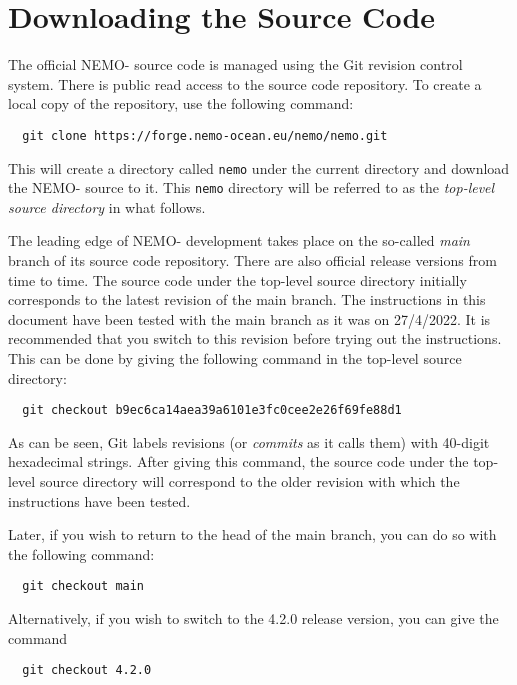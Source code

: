 \section{Downloading the Source Code}
\label{sec:download}

The official NEMO-\SIcu{} source code is managed using the Git revision control system.
There is public read access to the source code repository.
To create a local copy of the repository, use the following command:

\begin{verbatim}
  git clone https://forge.nemo-ocean.eu/nemo/nemo.git
\end{verbatim}

\noindent{}This will create a directory called \verb|nemo| under the current directory and download the NEMO-\SIcu{} source to it.
This \verb|nemo| directory will be referred to as the \textit{top-level source directory} in what follows.

The leading edge of NEMO-\SIcu{} development takes place on the so-called \textit{main} branch of its source code repository.
There are also official release versions from time to time.
The source code under the top-level source directory initially corresponds to the latest revision of the main branch.
The instructions in this document have been tested with the main branch as it was on 27/4/2022.
It is recommended that you switch to this revision before trying out the instructions.
This can be done by giving the following command in the top-level source directory:

\begin{verbatim}
  git checkout b9ec6ca14aea39a6101e3fc0cee2e26f69fe88d1
\end{verbatim}

\noindent{}As can be seen, Git labels revisions (or \textit{commits} as it calls them) with 40-digit hexadecimal strings.
After giving this command, the source code under the top-level source directory will correspond to the older revision with which the instructions have been tested.

Later, if you wish to return to the head of the main branch, you can do so with the following command:

\begin{verbatim}
  git checkout main
\end{verbatim}
Alternatively, if you wish to switch to the 4.2.0 release version, you can give the command

\begin{verbatim}
  git checkout 4.2.0
\end{verbatim}
